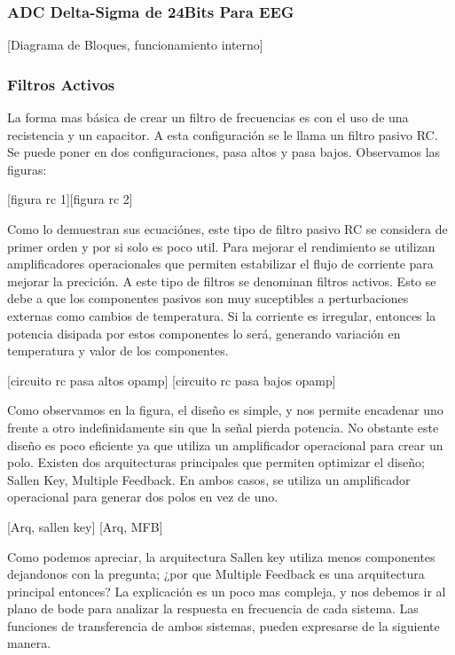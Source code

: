 \subsubsection{ADC Delta-Sigma de 24Bits Para EEG}
\label{sec:org1eaea2f}

[Diagrama de Bloques, funcionamiento interno]

\subsubsection{Filtros Activos}
\label{sec:org67942fb}
La forma mas básica de crear un filtro de frecuencias es con el uso de una recistencia y un capacitor. A esta configuración se le llama un filtro pasivo RC. Se puede poner en dos configuraciones, pasa altos y pasa bajos. Observamos las figuras:

[figura rc 1][figura rc 2]

Como lo demuestran sus ecuaciónes, este tipo de filtro pasivo RC se considera de primer orden y por si solo es poco util. Para mejorar el rendimiento se utilizan amplificadores operacionales que permiten estabilizar el flujo de corriente para mejorar la precición. A este tipo de filtros se denominan filtros activos. Esto se debe a que los componentes pasivos son muy suceptibles a perturbaciones externas como cambios de temperatura. Si la corriente es irregular, entonces la potencia disipada por estos componentes lo será, generando variación en temperatura y valor de los componentes.

[circuito rc pasa altos opamp]
[circuito rc pasa bajos opamp]

Como observamos en la figura, el diseño es simple, y nos permite encadenar uno frente a otro indefinidamente sin que la señal pierda potencia. No obstante este diseño es poco eficiente ya que utiliza un amplificador operacional para crear un polo. Existen dos arquitecturas principales que permiten optimizar el diseño; Sallen Key, Multiple Feedback. En ambos casos, se utiliza un amplificador operacional para generar dos polos en vez de uno.

[Arq, sallen key] [Arq, MFB]

Como podemos apreciar, la arquitectura Sallen key utiliza menos componentes dejandonos con la pregunta; ¿por que Multiple Feedback es una arquitectura principal entonces? La explicación es un poco mas compleja, y nos debemos ir al plano de bode para analizar la respuesta en frecuencia de cada sistema. Las funciones de transferencia de ambos sistemas, pueden expresarse de la siguiente manera.

